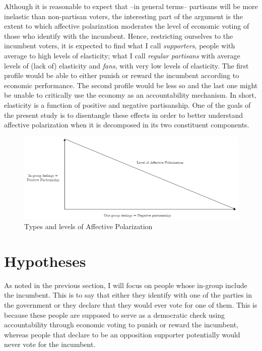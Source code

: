 \documentclass[a4paper, svgnames]{article}
\begin{document}
Although it is reasonable to expect that --in general terms-- partisans will be more inelastic than non-partisan voters, the interesting part of the argument is the extent to which affective polarization moderates the level of economic voting of those who identify with the incumbent. Hence, restricting ourselves to the incumbent voters, it is expected to find what I call \textit{supporters}, people with average to high levels of elasticity; what I call \textit{regular partisans} with average levels of (lack of) elasticity and \textit{fans}, with very low levels of elasticity. The first profile would be able to either punish or reward the incumbent according to economic performance. The second profile would be less so and the last one might be unable to critically use the economy as an accountability mechanism. In short, elasticity is a function of positive and negative partisanship. One of the goals of the present study is to disentangle these effects in order to better understand affective polarization when it is decomposed in its two constituent components.

\begin{figure}[H]
	\centering
	\includegraphics[scale=0.55]{Figures/AP.drawio.png}
	\caption{Types and levels of Affective Polarization}
	\label{fig:types_and_levels_of_AP}
\end{figure}
\section{Hypotheses}

As noted in the previous section, I will focus on people whose in-group include the incumbent. This is to say that either they identify with one of the parties in the government or they declare that they would ever vote for one of them. This is because these people are supposed to serve as a democratic check using accountability through economic voting to punish or reward the incumbent, whereas people that declare to be an opposition supporter potentially would never vote for the incumbent.
\end{document}
